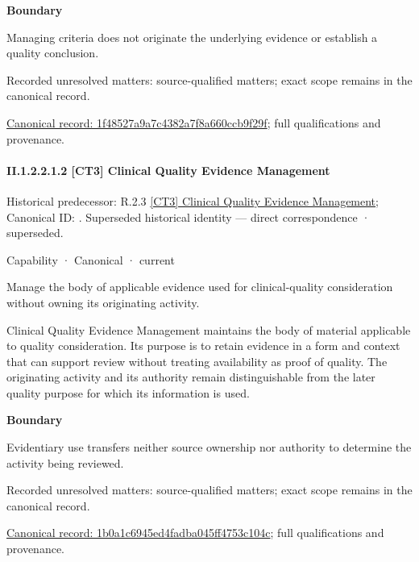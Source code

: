 \textbf{Boundary}



Managing criteria does not originate the underlying evidence or establish a quality conclusion.


{\small Recorded unresolved matters: source-qualified matters; exact scope remains in the canonical record.}\par
{\footnotesize \href{../../../../continuum/strategy/capability/1f48527a9a7c4382a7f8a660ccb9f29f.md}{Canonical record: 1f48527a9a7c4382a7f8a660ccb9f29f}; full qualifications and provenance.}\par
\paragraph*{II.1.2.2.1.2 [CT3] Clinical Quality Evidence Management}
\label{navigation:II.1.2.2.1.2}

{\small Historical predecessor: R.2.3 \hyperref[element:f31902d474894670aeef3e0abbedccf0]{[CT3] Clinical Quality Evidence Management}; Canonical ID: \texttt{}. Superseded historical identity — direct correspondence · superseded.}\par
\label{element:1b0a1c6945ed4fadba045ff4753c104c}
{\small Capability · Canonical · current}\par

Manage the body of applicable evidence used for clinical-quality consideration without owning its originating activity.



Clinical Quality Evidence Management maintains the body of material applicable to quality consideration. Its purpose is to retain evidence in a form and context that can support review without treating availability as proof of quality. The originating activity and its authority remain distinguishable from the later quality purpose for which its information is used.



\textbf{Boundary}



Evidentiary use transfers neither source ownership nor authority to determine the activity being reviewed.


{\small Recorded unresolved matters: source-qualified matters; exact scope remains in the canonical record.}\par
{\footnotesize \href{../../../../continuum/strategy/capability/1b0a1c6945ed4fadba045ff4753c104c.md}{Canonical record: 1b0a1c6945ed4fadba045ff4753c104c}; full qualifications and provenance.}\par
